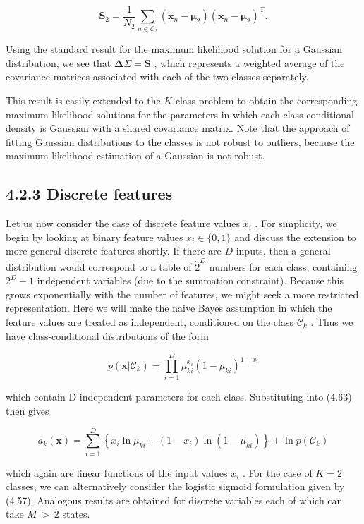 \documentclass[
  10
]{article}
\begin{document}
\[
\mathbf {S} _ {2} = \frac {1}{N _ {2}} \sum_ {n \in \mathcal {C} _ {2}} (\mathbf {x} _ {n} - \boldsymbol {\mu} _ {2}) (\mathbf {x} _ {n} - \boldsymbol {\mu} _ {2}) ^ {\mathrm{T}}.\tag{4.80}
\]

Using the standard result for the maximum likelihood solution for a
Gaussian distribution, we see that
\(\mathbf { \Delta } \Sigma = \mathbf { S }\) , which represents a
weighted average of the covariance matrices associated with each of the
two classes separately.

This result is easily extended to the \(K\) class problem to obtain the
corresponding maximum likelihood solutions for the parameters in which
each class-conditional density is Gaussian with a shared covariance
matrix. Note that the approach of fitting Gaussian distributions to the
classes is not robust to outliers, because the maximum likelihood
estimation of a Gaussian is not robust.

\subsection{4.2.3 Discrete features}\label{discrete-features}

Let us now consider the case of discrete feature values \(x _ { i }\) .
For simplicity, we begin by looking at binary feature values
\(x _ { i } \in \{ 0 , 1 \}\) and discuss the extension to more general
discrete features shortly. If there are \(D\) inputs, then a general
distribution would correspond to a table of
\(\mathrm { \dot { 2 } } ^ { D }\) numbers for each class, containing
\(2 ^ { D } - 1\) independent variables (due to the summation
constraint). Because this grows exponentially with the number of
features, we might seek a more restricted representation. Here we will
make the naive Bayes assumption in which the feature values are treated
as independent, conditioned on the class \(\mathcal { C } _ { k }\) .
Thus we have class-conditional distributions of the form

\[
p (\mathbf {x} | \mathcal {C} _ {k}) = \prod_ {i = 1} ^ {D} \mu_ {k i} ^ {x _ {i}} (1 - \mu_ {k i}) ^ {1 - x _ {i}}\tag{4.81}
\]

which contain D independent parameters for each class. Substituting into
(4.63) then gives

\[
a _ {k} (\mathbf {x}) = \sum_ {i = 1} ^ {D} \left\{x _ {i} \ln \mu_ {k i} + (1 - x _ {i}) \ln (1 - \mu_ {k i}) \right\} + \ln p (\mathcal {C} _ {k})\tag{4.82}
\]

which again are linear functions of the input values \(x _ { i }\) . For
the case of \(K = 2\) classes, we can alternatively consider the
logistic sigmoid formulation given by (4.57). Analogous results are
obtained for discrete variables each of which can take \(M \ > \ 2\)
states.
\end{document}
